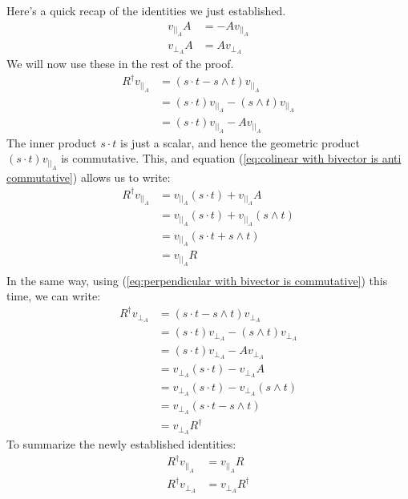 \documentclass[10pt]{report}
\begin{document}
Here's a quick recap of the identities we just established.
\begin{align}
    v_{||_A}A &= -Av_{||_A}         \label{eq:colinear with bivector is anti commutative} \\
    v_{\bot_A}A &= Av_{\bot_A}      \label{eq:perpendicular with bivector is commutative}
\end{align}
We will now use these in the rest of the proof.
\begin{align*}
    R^\dagger v_{||_A} &= (s\cdot t - s\wedge t) v_{||_A}           \\
                       &= (s\cdot t)v_{||_A} - (s\wedge t)v_{||_A}  \\
                       &= (s\cdot t)v_{||_A} - Av_{||_A}
\end{align*}
The inner product $s\cdot t$ is just a scalar, and hence the
geometric product $(s\cdot t)v_{||_A}$ is commutative. This, and
equation (\ref{eq:colinear with bivector is anti commutative})
allows us to write:
\begin{align*}
    R^\dagger v_{||_A} &= v_{||_A}(s\cdot t) + v_{||_A}A            \\
                       &= v_{||_A}(s\cdot t) + v_{||_A}(s\wedge t)  \\
                       &= v_{||_A}(s\cdot t + s\wedge t)            \\
                       &= v_{||_A}R                                 \\
\end{align*}
In the same way, using (\ref{eq:perpendicular with bivector is
commutative}) this time, we can write:
\begin{align*}
    R^\dagger v_{\bot_A} &= (s\cdot t - s\wedge t) v_{\bot_A}             \\
                         &= (s\cdot t)v_{\bot_A} - (s\wedge t)v_{\bot_A}  \\
                         &= (s\cdot t)v_{\bot_A} - Av_{\bot_A}            \\
                         &= v_{\bot_A}(s\cdot t) - v_{\bot_A}A            \\
                         &= v_{\bot_A}(s\cdot t) - v_{\bot_A}(s\wedge t)  \\
                         &= v_{\bot_A}(s\cdot t - s\wedge t)              \\
                         &= v_{\bot_A}R^\dagger
\end{align*}
To summarize the newly established identities:
\begin{align}
    R^\dagger v_{||_A} &= v_{||_A}R                     \label{eq:Rd v is v R} \\
    R^\dagger v_{\bot_A} &= v_{\bot_A}R^\dagger         \label{eq:Rd v is v Rd}
\end{align}
\end{document}
